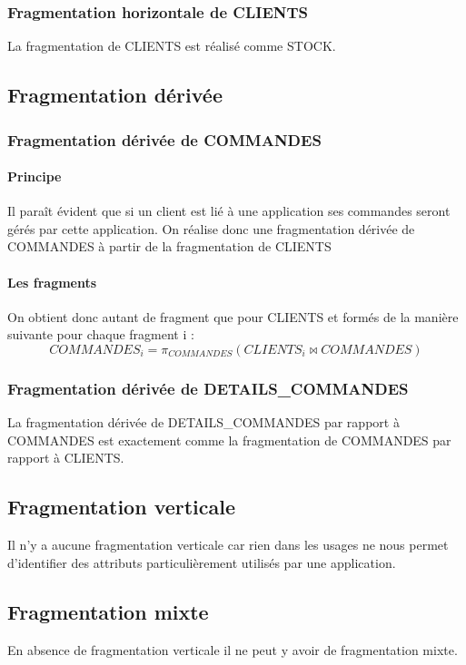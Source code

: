 \documentclass[10pt,a4paper,twoside]{article}
\begin{document}
\subsubsection{Fragmentation horizontale de CLIENTS}
La fragmentation de CLIENTS est réalisé comme STOCK.

\subsection{Fragmentation dérivée}
\subsubsection{Fragmentation dérivée de COMMANDES}
\paragraph{Principe}
Il paraît évident que si un client est lié à une application ses commandes seront gérés par cette application. On réalise donc une fragmentation dérivée de COMMANDES à partir de la fragmentation de CLIENTS

\paragraph{Les fragments}
On obtient donc autant de fragment que pour CLIENTS et formés de la manière suivante pour chaque fragment i :
$$COMMANDES_{i} = \pi_{COMMANDES}(CLIENTS_{i} \bowtie  COMMANDES)$$

\subsubsection{Fragmentation dérivée de DETAILS\_COMMANDES}
La fragmentation dérivée de DETAILS\_COMMANDES par rapport à COMMANDES est exactement comme la fragmentation de COMMANDES par rapport à CLIENTS.

\subsection{Fragmentation verticale}
Il n'y a aucune fragmentation verticale car rien dans les usages ne nous permet d'identifier des attributs particulièrement utilisés par une application.
\subsection{Fragmentation mixte}
En absence de fragmentation verticale il ne peut y avoir de fragmentation mixte.
\end{document}
